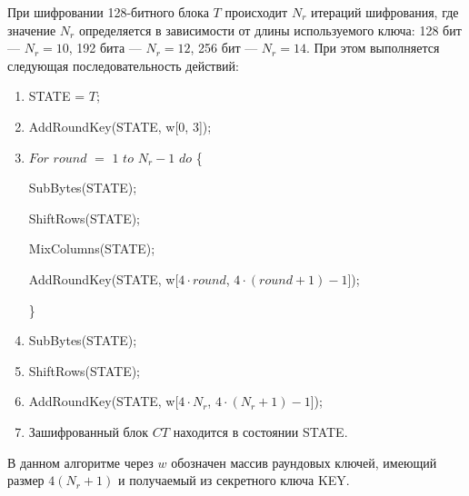 \documentclass{./civarticle}
\begin{document}
При шифровании 128-битного блока $T$ происходит $N_r$ итераций шифрования, где значение $N_r$ определяется в зависимости от длины используемого ключа: 128 бит --- $N_r = 10$, 192 бита --- $N_r = 12$, 256 бит --- $N_r = 14$. При этом выполняется следующая последовательность действий:
\begin{enumerate}
    \item STATE = $T$;

    \item AddRoundKey(STATE, w[0, 3]);

    \item $For$ $round$ $=$ $1$ $to$ $N_r - 1$ $do$ \{ 

    \hspace{0.5cm} SubBytes(STATE);

    \hspace{0.5cm} ShiftRows(STATE);

    \hspace{0.5cm} MixColumns(STATE);

    \hspace{0.5cm} AddRoundKey(STATE, w[$4\cdot round$, $4\cdot(round + 1) - 1$]);
    
    \}

    \item SubBytes(STATE);

    \item ShiftRows(STATE);

    \item AddRoundKey(STATE, w[$4\cdot N_r$, $4\cdot (N_r + 1) - 1$]);

    \item Зашифрованный блок $CT$ находится в состоянии STATE.
    
\end{enumerate}

В данном алгоритме через $w$ обозначен массив раундовых ключей, имеющий размер $4(N_r + 1)$ и получаемый из секретного ключа KEY.
\end{document}

